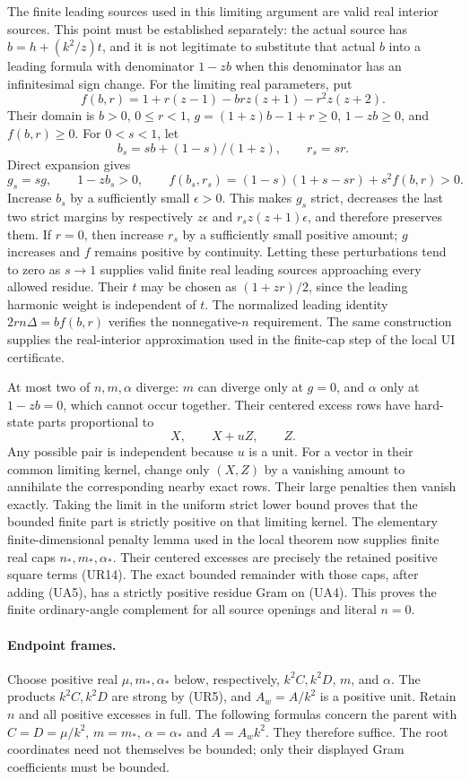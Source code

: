 The finite leading sources used in this limiting argument are valid
real interior sources. This point must be established separately:
the actual source has $b=h+(k^2/z)t$, and it is not legitimate to
substitute that actual $b$ into a leading formula with denominator
$1-zb$ when this denominator has an infinitesimal sign change.
For the limiting real parameters, put
\[
 f(b,r)=1+r(z-1)-brz(z+1)-r^2z(z+2).
\]
Their domain is $b>0$, $0\le r<1$, $g=(1+z)b-1+r\ge0$,
$1-zb\ge0$, and $f(b,r)\ge0$. For $0<s<1$, let
\[
 b_s=sb+(1-s)/(1+z),\qquad r_s=sr.
\]
Direct expansion gives
\[
 g_s=sg,\qquad 1-zb_s>0,\qquad
 f(b_s,r_s)=(1-s)(1+s-sr)+s^2f(b,r)>0.
\]
Increase $b_s$ by a sufficiently small $\epsilon>0$. This makes
$g_s$ strict, decreases the last two strict margins by respectively
$z\epsilon$ and $r_sz(z+1)\epsilon$, and therefore preserves them.
If $r=0$, then increase $r_s$ by a sufficiently small positive
amount; $g$ increases and $f$ remains positive by continuity.
Letting these perturbations tend to zero as $s\to1$ supplies valid
finite real leading sources approaching every allowed residue.
Their $t$ may be chosen as $(1+zr)/2$, since the leading harmonic
weight is independent of $t$. The normalized leading identity
$2rn\Delta=bf(b,r)$ verifies the nonnegative-$n$ requirement.
The same construction supplies the real-interior approximation
used in the finite-cap step of the local UI certificate.

At most two of $n,m,\alpha$ diverge: $m$ can diverge only at $g=0$,
and $\alpha$ only at $1-zb=0$, which cannot occur together. Their
centered excess rows have hard-state parts proportional to
\[
 X,\qquad X+uZ,\qquad Z.
\]
Any possible pair is independent because $u$ is a unit. For a vector
in their common limiting kernel, change only $(X,Z)$ by a vanishing
amount to annihilate the corresponding nearby exact rows. Their
large penalties then vanish exactly. Taking the limit in the uniform
strict lower bound proves that the bounded finite part is strictly
positive on that limiting kernel. The elementary finite-dimensional
penalty lemma used in the local theorem now supplies finite real caps
$n_*,m_*,\alpha_*$. Their centered excesses are precisely the retained
positive square terms (UR14). The exact bounded remainder with those caps, after
adding (UA5), has a strictly positive residue Gram on (UA4).
This proves the finite ordinary-angle complement for all source
openings and literal $n=0$.

\paragraph{Endpoint frames.}
Choose positive real $\mu,m_*,\alpha_*$ below, respectively,
$k^2C,k^2D$, $m$, and $\alpha$. The products $k^2C,k^2D$ are strong
by (UR5), and $A_w=A/k^2$ is a positive unit. Retain $n$ and all
positive excesses in full. The following formulas concern the parent
with $C=D=\mu/k^2$, $m=m_*$, $\alpha=\alpha_*$ and $A=A_wk^2$.
They therefore suffice. The root coordinates need not themselves be
bounded; only their displayed Gram coefficients must be bounded.

